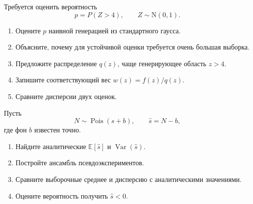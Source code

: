 \documentclass[
  russian,
  11pt,
  a4paper,
  open=any]{scrbook}
\providecommand{\tightlist}{%
  \setlength{\itemsep}{0pt}\setlength{\parskip}{0pt}}
\begin{document}
\begin{semanticpdfbox}[colback=BookCoralSoft,borderline west={1.2mm}{0pt}{BookCoral}]

\par\nopagebreak[4]\vspace{1.2mm}

Требуется оценить вероятность \[
p=P(Z>4),
\qquad
Z\sim\mathrm N(0,1).
\]

\begin{enumerate}
\def\labelenumi{\arabic{enumi}.}
\tightlist
\item
  Оцените \(p\) наивной генерацией из стандартного гаусса.
\item
  Объясните, почему для устойчивой оценки требуется очень большая
  выборка.
\item
  Предложите распределение \(q(z)\), чаще генерирующее область \(z>4\).
\item
  Запишите соответствующий вес \(w(z)=f(z)/q(z)\).
\item
  Сравните дисперсии двух оценок.
\end{enumerate}

\end{semanticpdfbox}

\begin{semanticpdfbox}[colback=BookCoralSoft,borderline west={1.2mm}{0pt}{BookCoral}]

\par\nopagebreak[4]\vspace{1.2mm}

Пусть \[
N\sim\operatorname{Pois}(s+b),
\qquad
\widehat s=N-b,
\] где фон \(b\) известен точно.

\begin{enumerate}
\def\labelenumi{\arabic{enumi}.}
\tightlist
\item
  Найдите аналитические \(\mathbb E[\widehat s]\) и
  \(\operatorname{Var}(\widehat s)\).
\item
  Постройте ансамбль псевдоэкспериментов.
\item
  Сравните выборочные среднее и дисперсию с аналитическими значениями.
\item
  Оцените вероятность получить \(\widehat s<0\).
\end{enumerate}

\end{semanticpdfbox}
\end{document}
